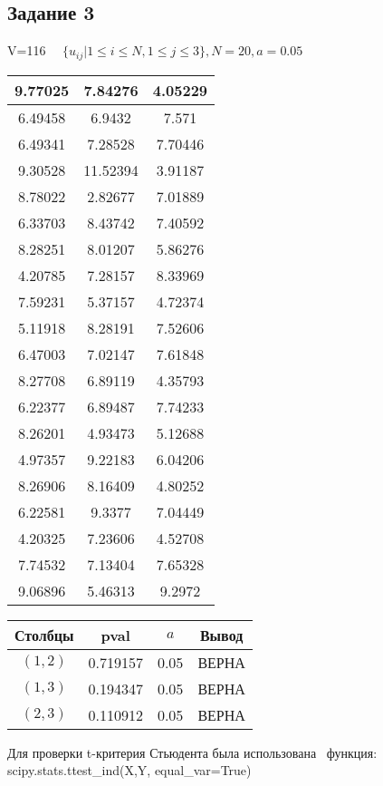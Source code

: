 \subsection{Задание 3}%
\label{subsec:3}%
%
V=116%
$\quad \{ u_{ij}|1 \le i \le N, 1\le j \le 3 \}, N=20, a =0.05 $

%
\begin{changemargin}{0cm}{0cm}\small{%
\center%
\begin{tabular}{|c|c|c|}%
\hline%
9.77025&7.84276&4.05229\\%
\hline%
6.49458&6.9432&7.571\\%
\hline%
6.49341&7.28528&7.70446\\%
\hline%
9.30528&11.52394&3.91187\\%
\hline%
8.78022&2.82677&7.01889\\%
\hline%
6.33703&8.43742&7.40592\\%
\hline%
8.28251&8.01207&5.86276\\%
\hline%
4.20785&7.28157&8.33969\\%
\hline%
7.59231&5.37157&4.72374\\%
\hline%
5.11918&8.28191&7.52606\\%
\hline%
6.47003&7.02147&7.61848\\%
\hline%
8.27708&6.89119&4.35793\\%
\hline%
6.22377&6.89487&7.74233\\%
\hline%
8.26201&4.93473&5.12688\\%
\hline%
4.97357&9.22183&6.04206\\%
\hline%
8.26906&8.16409&4.80252\\%
\hline%
6.22581&9.3377&7.04449\\%
\hline%
4.20325&7.23606&4.52708\\%
\hline%
7.74532&7.13404&7.65328\\%
\hline%
9.06896&5.46313&9.2972\\%
\hline%
\end{tabular}%
\newline%
\newline%
%
}\end{changemargin}%
\begin{changemargin}{-0cm}{0cm}\small{%
\center%
\begin{tabular}{|c|c|c|c|}%
\hline%
Столбцы&pval&$a$&Вывод\\%
\hline%
$(1,2)$&0.719157&0.05&ВЕРНА\\%
\hline%
$(1,3)$&0.194347&0.05&ВЕРНА\\%
\hline%
$(2,3)$&0.110912&0.05&ВЕРНА\\%
\hline%
\end{tabular}%
\newline%
\newline%
%
}\end{changemargin}%
Для проверки t-критерия Стьюдента была использована \
            функция: scipy.stats.ttest\_ind(X,Y, equal\_var=True)